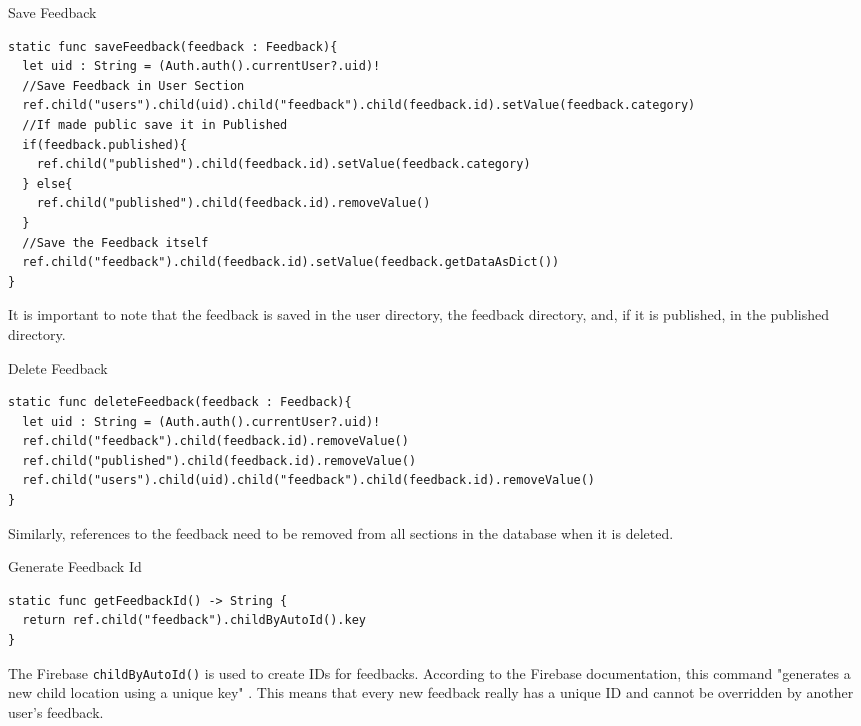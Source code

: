 \begin{listing}[H]
  \caption{Save Feedback}
  \label{mint:save_feedback}
  \begin{verbatim}
static func saveFeedback(feedback : Feedback){
  let uid : String = (Auth.auth().currentUser?.uid)!
  //Save Feedback in User Section
  ref.child("users").child(uid).child("feedback").child(feedback.id).setValue(feedback.category)
  //If made public save it in Published
  if(feedback.published){
    ref.child("published").child(feedback.id).setValue(feedback.category)
  } else{
    ref.child("published").child(feedback.id).removeValue()
  }
  //Save the Feedback itself
  ref.child("feedback").child(feedback.id).setValue(feedback.getDataAsDict())
}
  \end{verbatim}
\end{listing}
It is important to note that the feedback is saved in the user directory, the feedback directory, and, if it is published, in the published directory.

\begin{listing}[H]
  \caption{Delete Feedback}
  \label{mint:delete_feedback}
  \begin{verbatim}
static func deleteFeedback(feedback : Feedback){
  let uid : String = (Auth.auth().currentUser?.uid)!
  ref.child("feedback").child(feedback.id).removeValue()
  ref.child("published").child(feedback.id).removeValue()
  ref.child("users").child(uid).child("feedback").child(feedback.id).removeValue()
}
  \end{verbatim}
\end{listing}
Similarly, references to the feedback need to be removed from all sections in the database when it is deleted.

\begin{listing}[H]
  \caption{Generate Feedback Id}
  \label{mint:create_feedback_id}
  \begin{verbatim}
static func getFeedbackId() -> String {
  return ref.child("feedback").childByAutoId().key
}
  \end{verbatim}
\end{listing}
The Firebase \texttt{childByAutoId()} is used to create IDs for feedbacks. According to the Firebase documentation, this command "generates a new child location using a unique key" \cite{autoID}. This means that every new feedback really has a unique ID and cannot be overridden by another user's feedback.

